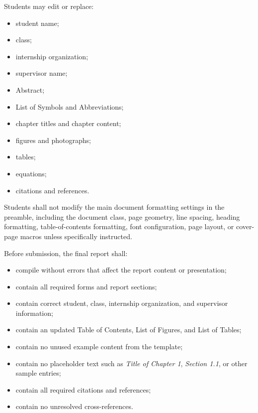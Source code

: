 {\vspace{0.15cm}

Students may edit or replace:

\begin{itemize}[leftmargin=0.8cm, itemsep=2pt]
    \item student name;
    \item class;
    \item internship organization;
    \item supervisor name;
    \item Abstract;
    \item List of Symbols and Abbreviations;
    \item chapter titles and chapter content;
    \item figures and photographs;
    \item tables;
    \item equations;
    \item citations and references.
\end{itemize}

Students shall not modify the main document formatting settings in the
preamble, including the document class, page geometry, line spacing,
heading formatting, table-of-contents formatting, font configuration,
page layout, or cover-page macros unless specifically instructed.

\vspace{0.3cm}


\noindent
{}

\vspace{0.15cm}

Before submission, the final report shall:

\begin{itemize}[leftmargin=0.8cm, itemsep=2pt]
    \item compile without errors that affect the report content or presentation;
    \item contain all required forms and report sections;
    \item contain correct student, class, internship organization, and supervisor information;
    \item contain an updated Table of Contents, List of Figures, and List of Tables;
    \item contain no unused example content from the template;
    \item contain no placeholder text such as \textit{Title of Chapter 1},
    \textit{Section 1.1}, or other sample entries;
    \item contain all required citations and references;
    \item contain no unresolved cross-references.
\end{itemize}

}
